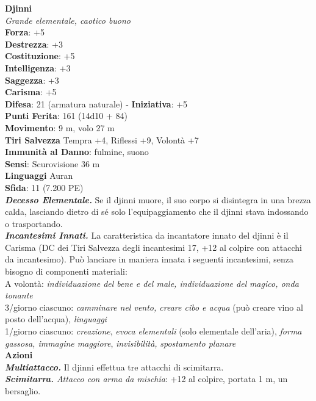 \begin{multicols}{2}
\medskip\textbf{Djinni}\\
\emph{Grande elementale, caotico buono}\\
\textbf{Forza}: +5\\
\textbf{Destrezza}: +3\\
\textbf{Costituzione}: +5\\
\textbf{Intelligenza}: +3\\
\textbf{Saggezza}: +3\\
\textbf{Carisma}: +5\\
\textbf{Difesa}: 21 (armatura naturale) - \textbf{Iniziativa}: +5\\
\textbf{Punti Ferita}: 161 (14d10 + 84)\\
\textbf{Movimento}: 9 m, volo 27 m\\
\textbf{Tiri Salvezza} Tempra +4, Riflessi +9, Volontà +7\\
\textbf{Immunità al Danno}: fulmine, suono\\
\textbf{Sensi}: Scurovisione 36 m\\
\textbf{Linguaggi} Auran\\
\textbf{Sfida}: 11 (7.200 PE)\smallskip\\
\emph{\textbf{Decesso Elementale.}} Se il djinni muore, il suo corpo si disintegra in una brezza calda, lasciando dietro di sé solo l'equipaggiamento che il djinni stava indossando o trasportando.\\
\emph{\textbf{Incantesimi Innati.}} La caratteristica da incantatore innato del djinni è il Carisma (DC dei Tiri Salvezza degli incantesimi 17, +12 al colpire con attacchi da incantesimo). Può lanciare in maniera innata i seguenti incantesimi, senza bisogno di componenti materiali: \\
A volontà: \emph{individuazione del bene e del male, individuazione del} \emph{magico, onda tonante}\\
3/giorno ciascuno: \emph{camminare nel vento, creare cibo e acqua} (può creare vino al posto dell'acqua), \emph{linguaggi}\\
1/giorno ciascuno: \emph{creazione}, \emph{evoca elementali} (solo elementale dell'aria), \emph{forma gassosa, immagine maggiore}, \emph{invisibilità,} \emph{spostamento planare}\\
\smallskip\textbf{Azioni}\\
\emph{\textbf{Multiattacco.}} Il djinni effettua tre attacchi di scimitarra.\\
\emph{\textbf{Scimitarra.} Attacco con arma da mischia}: +12 al colpire, portata 1 m, un bersaglio.\\

\end{multicols}
